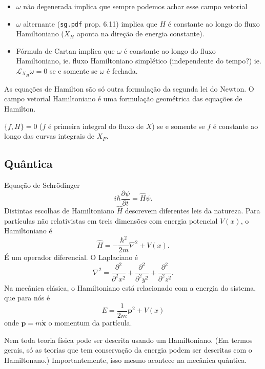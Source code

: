 \begin{itemize}
\item $\omega$ n\~ao degenerada implica que sempre podemos achar esse campo vetorial

\item  $\omega$ alternante (\texttt{sg.pdf} prop. 6.11) implica que $H$ \'e constante ao longo do fluxo Hamiltoniano ($X_H$ aponta na  dire\c c\~ao de energia constante).

\item F\'ormula de Cartan implica que $\omega$  \'e constante ao longo do fluxo Hamiltoniano, ie. fluxo Hamiltoniano simpl\'etico (independente do tempo?) ie. $\mathcal{L}_{X_H}\omega=0$ se e somente se $\omega$ \'e fechada.
\end{itemize}

As equa\c c\~oes de Hamilton s\~ao s\'o outra formula\c c\~ao da segunda lei do Newton. O campo vetorial Hamiltoniano \'e uma formula\c c\~ao geom\'etrica das equa\c c\~oes de Hamilton.

\begin{prop}
	$\{f,H\}=0$ ($f$ \'e primeira integral do fluxo de $X$) se e somente se $f$ \'e constante ao longo das curvas integrais de $X_F$.
\end{prop}

\subsection{Qu\^antica}



 Equa\c c\~ao de Schr\"odinger
 \[i\hbar \frac{\partial \psi}{\partial t}=\hat{H}\psi.\]
 Distintas escolhas de Hamiltoniano $\hat{H}$ descrevem diferentes leis da natureza. Para partículas não relativistas em treis dimensões com energia potencial $V(x)$, o Hamiltoniano  é
 \[\hat{H}=-\frac{\hbar^2}{2m}\nabla^2+V(x).\]
 \'E um operador diferencial. O Laplaciano \'e
 \[\nabla^2=\frac{\partial^2}{\partial^2 x^2}+\frac{\partial^2}{\partial^2 y^2}+\frac{\partial^2}{\partial^2z^2}.\]
 Na mec\^anica cl\'asica, o Hamiltoniano est\'a relacionado com a energia do sistema, que para n\'os \'e
 \[E=\frac{1}{2m}\mathbf{p}^2+V(x)\]
 onde $\mathbf{p}=m\dot{\mathbf{x}}$ o momentum da partícula.

 Nem toda teoria f\'isica pode ser descrita usando um Hamiltoniano. (Em termos gerais, s\'o as teorias que tem conserva\c c\~ao da energia podem ser descritas com o Hamiltonano.) Importantemente, isso mesmo acontece na mecânica quântica.

